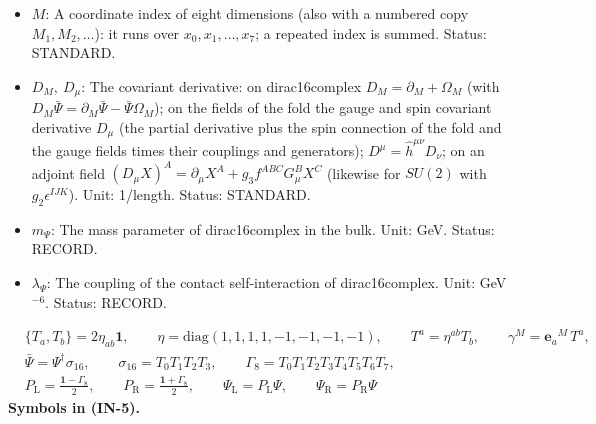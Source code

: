 \documentclass[
  10pt,
]{article}
\begin{document}
\begin{itemize}
  along the coordinates, \(\gamma^M = \mathbf{e}_a{}^MT^a\),
  \(\gamma_M = g_{MN}\gamma^N\); \(\gamma^{(a)} = T^a\) along the frame
  direction \((a)\) (\(\gamma^{(0)}\) along \(\sigma\), \(\gamma^{(4)}\)
  along the time). Unit: dimensionless. Status: AUTHOR.
\item
  \(M\): A coordinate index of eight dimensions (also with a numbered
  copy \(M_1, M_2, \dots\)): it runs over \(x_0, x_1, \dots, x_7\); a
  repeated index is summed. Status: STANDARD.
\item
  \(D_M,\ D_\mu\): The covariant derivative: on dirac16complex
  \(D_M = \partial_M + \Omega_M\) (with
  \(D_M\bar\Psi = \partial_M\bar\Psi - \bar\Psi\Omega_M\)); on the
  fields of the fold the gauge and spin covariant derivative \(D_\mu\)
  (the partial derivative plus the spin connection of the fold and the
  gauge fields times their couplings and generators);
  \(D^\mu = \hat h^{\mu\nu}D_\nu\); on an adjoint field
  \((D_\mu X)^A = \partial_\mu X^A + g_3f^{ABC}G^B_\mu X^C\) (likewise
  for \(SU(2)\) with \(g_2\epsilon^{IJK}\)). Unit: 1/length. Status:
  STANDARD.
\item
  \(m_\Psi\): The mass parameter of dirac16complex in the bulk. Unit:
  GeV. Status: RECORD.
\item
  \(\lambda_\Psi\): The coupling of the contact self-interaction of
  dirac16complex. Unit: GeV\(^{-6}\). Status: RECORD.
\end{itemize}

\[
\begin{aligned}
&\{T_a, T_b\} = 2\eta_{ab}\mathbf{1},\qquad \eta = \mathrm{diag}(1, 1, 1, 1, -1, -1, -1, -1),\qquad T^a = \eta^{ab}T_b,
 \qquad \gamma^M = \mathbf{e}_a{}^M\,T^a,\\
&\bar\Psi = \Psi^\dagger\sigma_{16},\qquad \sigma_{16} = T_0T_1T_2T_3,\qquad \Gamma_8 = T_0T_1T_2T_3T_4T_5T_6T_7,\\
&P_{\mathrm{L}} = \frac{\mathbf{1} - \Gamma_8}{2},\qquad P_{\mathrm{R}} = \frac{\mathbf{1} + \Gamma_8}{2},\qquad
 \Psi_{\mathrm{L}} = P_{\mathrm{L}}\Psi,\qquad \Psi_{\mathrm{R}} = P_{\mathrm{R}}\Psi
\end{aligned} \tag{IN-5}
\] \textbf{Symbols in (IN-5).}
\end{document}
